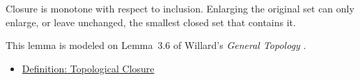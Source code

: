 \begin{remark*}[Interpretation]
Closure is monotone with respect to inclusion.  Enlarging the original set can
only enlarge, or leave unchanged, the smallest closed set that contains it.
\end{remark*}

\begin{remark*}
This lemma is modeled on Lemma~3.6 of Willard's
\emph{General Topology} \cite{WillardGeneralTopology}.
\end{remark*}

\begin{dependencies}
\begin{itemize}
  \item \hyperref[def:topological-closure]{Definition: Topological Closure}
\end{itemize}
\end{dependencies}

